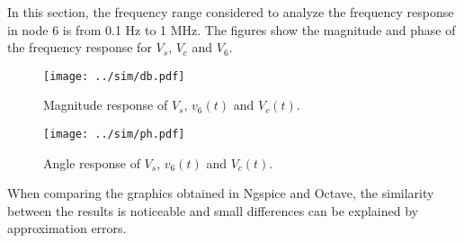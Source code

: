 In this section, the frequency range considered to analyze the frequency response in node 6 is from 0.1 Hz to 1 MHz. The figures show the magnitude and phase of the frequency response for $V_s$, $V_c$ and $V_6$.

\begin{figure}[h] \centering
\vspace{-3cm}
\texttt{[image: ../sim/db.pdf]}
\caption{Magnitude response of $V_s$, $v_6(t)$ and $V_c(t)$.}
\label{fig:SIM_MAG}
\end{figure}

\begin{figure}[h] \centering
\vspace{-3cm}
\texttt{[image: ../sim/ph.pdf]}
\caption{Angle response of $V_s$, $v_6(t)$ and $V_c(t)$.}
\label{fig:SIM_ANG}
\end{figure}

When comparing the graphics obtained in Ngspice and Octave, the similarity between the results is noticeable and small differences can be explained by approximation errors.



